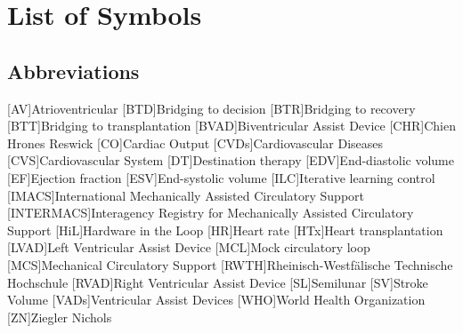 \chapter*{List of Symbols}										%



\section*{Abbreviations}
%
[AV]{Atrioventricular}
[BTD]{Bridging to decision}
[BTR]{Bridging to recovery}
[BTT]{Bridging to transplantation}
[BVAD]{Biventricular Assist Device}
[CHR]{Chien Hrones Reswick}
[CO]{Cardiac Output}
[CVDs]{Cardiovascular Diseases}
[CVS]{Cardiovascular System}
[DT]{Destination therapy}
[EDV]{End-diastolic volume}
[EF]{Ejection fraction}
[ESV]{End-systolic volume}
[ILC]{Iterative learning control}
[IMACS]{International Mechanically Assisted Circulatory Support}
[INTERMACS]{Interagency Registry for Mechanically Assisted Circulatory Support}
[HiL]{Hardware in the Loop}
[HR]{Heart rate}
[HTx]{Heart transplantation}
[LVAD]{Left Ventricular Assist Device}
[MCL]{Mock circulatory loop}
[MCS]{Mechanical Circulatory Support}
[RWTH]{Rheinisch-Westf{\"a}lische Technische Hochschule}
[RVAD]{Right Ventricular Assist Device}
[SL]{Semilunar}
[SV]{Stroke Volume}
[VADs]{Ventricular Assist Devices}
[WHO]{World Health Organization}
[ZN]{Ziegler Nichols}


